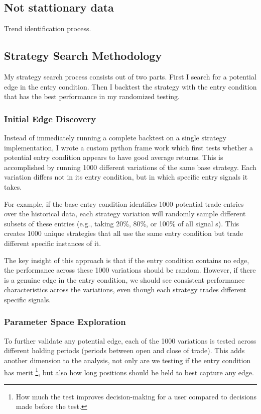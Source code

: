 \documentclass[12pt]{article}
\begin{document}
\newpage
\subsection*{Not stattionary data}
Trend identification process.


\newpage

\subsection*{Strategy Search Methodology}

My strategy search process consists out of two parts. First I search for a potential edge in the entry condition. Then I backtest the strategy with the entry condition that has the best performance in my randomized testing.


\subsubsection*{Initial Edge Discovery}
Instead of immediately running a complete backtest on a single strategy implementation, I wrote a custom python frame work which first tests whether a potential entry condition appears to have good average returns. This is accomplished by running 1000 different variations of the same base strategy. Each variation differs not in its entry condition, but in which specific entry signals it takes.

For example, if the base entry condition identifies 1000 potential trade entries over the historical data, each strategy variation will randomly sample different subsets of these entries (e.g., taking 20\%, 80\%, or 100\% of all signal s). This creates 1000 unique strategies that all use the same entry condition but trade different specific instances of it.

The key insight of this approach is that if the entry condition contains no edge, the performance across these 1000 variations should be random. However, if there is a genuine edge in the entry condition, we should see consistent performance characteristics across the variations, even though each strategy trades different specific signals.

\subsubsection*{Parameter Space Exploration}
To further validate any potential edge, each of the 1000 variations is tested across different holding periods (periods between open and close of trade). This adds another dimension to the analysis, not only are we testing if the entry condition has merit \footnote[1]{How much the test improves decision-making for a user compared to decisions made before the test.}, but also how long positions should be held to best capture any edge.
\end{document}
